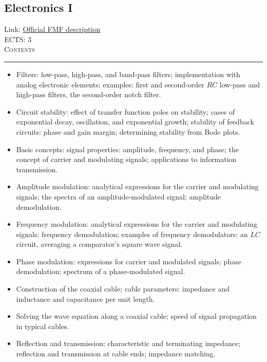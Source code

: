 \documentclass[11pt, a4paper]{article}
\newenvironment{course}[3]{
\subsection{#1}%
Link: \href{#2}{Official FMF description}\\%
ECTS: #3%
\vspace{1ex}
\\
{\large \textsc{Contents}}\\[-0.9ex]%
\rule{\textwidth}{0.5pt}
\vspace{-3ex}
}
{}
\newenvironment{chapter}[1]{
\begin{tcolorbox}[title=#1, breakable]
}
{\end{tcolorbox}}
\begin{document}
\begin{course}{Electronics I}{https://www.fmf.uni-lj.si/en/study-physics/programmes/1fiz/2020/7000777/courses/1134/}{3}
\begin{chapter}{Circuit analysis}
\begin{itemize}
            \item Filters: low-pass, high-pass, and band-pass filters; implementation with analog electronic elements; examples: first and second-order $ RC $ low-pass and high-pass filters, the second-order notch filter.

            \item Circuit stability: effect of transfer function poles on stability; cases of exponential decay, oscillation, and exponential growth; stability of feedback circuits: phase and gain margin; determining stability from Bode plots.
        \end{itemize}
    \end{chapter}

    \begin{chapter}{Modulation}
        \begin{itemize}
        
            \item Basic concepts: signal properties: amplitude, frequency, and phase; the concept of carrier and modulating signals; applications to information transmission.

            \item Amplitude modulation: analytical expressions for the carrier and modulating signals; the spectra of an amplitude-modulated signal; amplitude demodulation.

            \item Frequency modulation: analytical expressions for the carrier and modulating signals; frequency demodulation; examples of frequency demodulators: an $ LC $ circuit, averaging a comparator's square wave signal.

            \item Phase modulation: expressions for carrier and modulated signals; phase demodulation; spectrum of a phase-modulated signal.
        
        \end{itemize}
    \end{chapter}

    \begin{chapter}{Signal propagation along coaxial cables}
        \begin{itemize}
        
            \item Construction of the coaxial cable; cable parameters: impedance and inductance and capacitance per unit length.

            \item Solving the wave equation along a coaxial cable; speed of signal propagation in typical cables.

            \item Reflection and transmission: characteristic and terminating impedance; reflection and transmission at cable ends; impedance matching.
        
        \end{itemize}
    \end{chapter}
\end{course}
\end{document}
